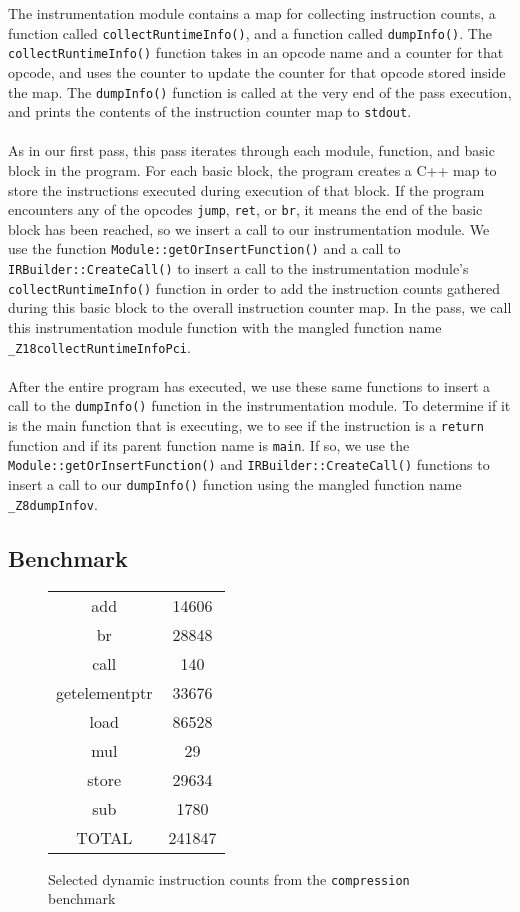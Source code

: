 \documentclass[12pt]{article}
\begin{document}
The instrumentation module contains a map for collecting instruction counts, a function called {\tt collectRuntimeInfo()}, and a function called {\tt dumpInfo()}. The {\tt collectRuntimeInfo()} function takes in an opcode name and a counter for that opcode, and uses the counter to update the counter for that opcode stored inside the map. The {\tt dumpInfo()} function is called at the very end of the pass execution, and prints the contents of the instruction counter map to {\tt stdout}. 
\\\\
As in our first pass, this pass iterates through each module, function, and basic block in the program. For each basic block, the program creates a C++ map to store the instructions executed during execution of that block. If the program encounters any of the opcodes {\tt jump}, {\tt ret}, or {\tt br}, it means the end of the basic block has been reached, so we insert a call to our instrumentation module. We use the function {\tt Module::getOrInsertFunction()} and a call to {\tt IRBuilder::CreateCall()}  to insert a call to the instrumentation module's {\tt collectRuntimeInfo()} function in order to add the instruction counts gathered during this basic block to the overall instruction counter map.    In the pass, we call this instrumentation module function with the mangled function name {\tt \_Z18collectRuntimeInfoPci}. 
\\\\
After the entire program has executed, we use these same functions to insert a call to the {\tt dumpInfo()} function in the instrumentation module. To determine if it is the main function that is executing, we to see if the instruction is a {\tt return} function and if its parent function name is {\tt main}. If so, we use the {\tt Module::getOrInsertFunction()} and {\tt IRBuilder::CreateCall()} functions to insert a call to our {\tt dumpInfo()} function using the mangled function name {\tt \_Z8dumpInfov}. 

\subsection{Benchmark}

\begin{figure*}[!t]
\begin{center}
\begin{tabular} { |c|c| }
\hline
	add & 14606 \\
	br & 28848 \\
	call & 140 \\
	getelementptr & 33676 \\
	load & 86528 \\
	mul & 29 \\
	store & 29634 \\
	sub & 1780 \\
	TOTAL & 241847 \\
\hline
\end{tabular}
\caption{Selected dynamic instruction counts from the {\tt compression} benchmark}
\label{DYNAMIC}
\end{center}
\end{figure*}
\end{document}
